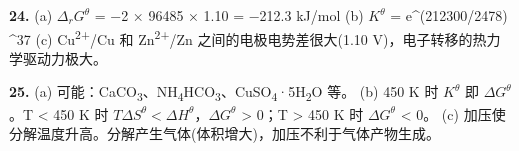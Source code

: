 \textbf{24.}
(a) \(\Delta_r G^\theta\) = −2 × 96485 × 1.10 = −212.3 kJ/mol
(b) \(K^\theta\) = e\^{}(212300/2478) \^{}37
(c) Cu\textsuperscript{2+}/Cu 和 Zn\textsuperscript{2+}/Zn 之间的电极电势差很大(1.10 V)，电子转移的热力学驱动力极大。

\textbf{25.}
(a) 可能：CaCO\textsubscript{3}、NH\textsubscript{4}HCO\textsubscript{3}、CuSO\textsubscript{4}·5H\textsubscript{2}O 等。
(b) 450 K 时 \(K^\theta\)  即 \(\Delta G^\theta\) 。T \textless{} 450 K 时 \(T\Delta S^\theta < \Delta H^\theta\)，\(\Delta G^\theta\) \textgreater{} 0；T \textgreater{} 450 K 时 \(\Delta G^\theta\) \textless{} 0。
(c) 加压使分解温度升高。分解产生气体(体积增大)，加压不利于气体产物生成。

